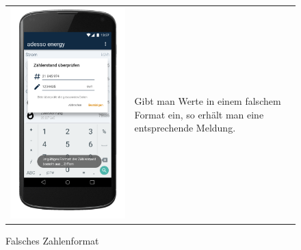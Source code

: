 \begin{figure}[h]
\begin{tabularx}{\textwidth}{X  X}
	\includegraphics[scale = 0.155]{img/AndroidMockup/illegalFormatException} \caption{Falsches Zahlenformat} & Gibt man Werte in einem falschem Format ein, so erhält man eine entsprechende Meldung. \\

\end{tabularx}
\end{figure}
